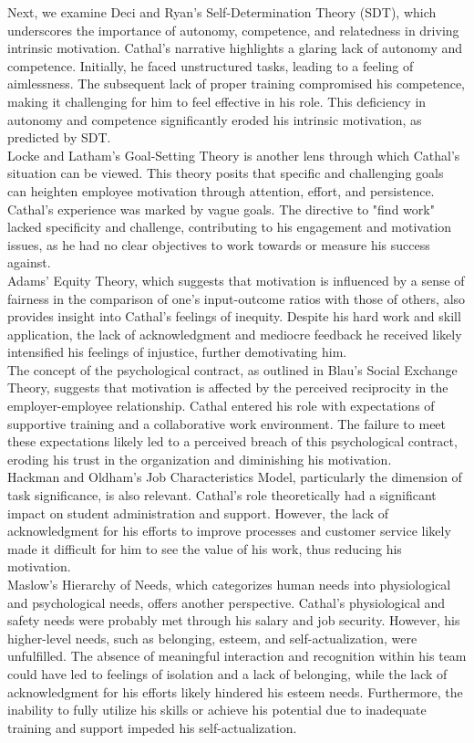 \documentclass[12pt]{article}
\begin{document}
\begin{flushleft}
Next, we examine Deci and Ryan's Self-Determination Theory (SDT), which underscores the importance of autonomy, competence, and relatedness in driving intrinsic motivation. Cathal's narrative highlights a glaring lack of autonomy and competence. Initially, he faced unstructured tasks, leading to a feeling of aimlessness. The subsequent lack of proper training compromised his competence, making it challenging for him to feel effective in his role. This deficiency in autonomy and competence significantly eroded his intrinsic motivation, as predicted by SDT.\\
Locke and Latham's Goal-Setting Theory is another lens through which Cathal's situation can be viewed. This theory posits that specific and challenging goals can heighten employee motivation through attention, effort, and persistence. Cathal's experience was marked by vague goals. The directive to "find work" lacked specificity and challenge, contributing to his engagement and motivation issues, as he had no clear objectives to work towards or measure his success against.\\
Adams' Equity Theory, which suggests that motivation is influenced by a sense of fairness in the comparison of one's input-outcome ratios with those of others, also provides insight into Cathal's feelings of inequity. Despite his hard work and skill application, the lack of acknowledgment and mediocre feedback he received likely intensified his feelings of injustice, further demotivating him.\\
The concept of the psychological contract, as outlined in Blau's Social Exchange Theory, suggests that motivation is affected by the perceived reciprocity in the employer-employee relationship. Cathal entered his role with expectations of supportive training and a collaborative work environment. The failure to meet these expectations likely led to a perceived breach of this psychological contract, eroding his trust in the organization and diminishing his motivation.\\
Hackman and Oldham's Job Characteristics Model, particularly the dimension of task significance, is also relevant. Cathal's role theoretically had a significant impact on student administration and support. However, the lack of acknowledgment for his efforts to improve processes and customer service likely made it difficult for him to see the value of his work, thus reducing his motivation.\\
Maslow's Hierarchy of Needs, which categorizes human needs into physiological and psychological needs, offers another perspective. Cathal's physiological and safety needs were probably met through his salary and job security. However, his higher-level needs, such as belonging, esteem, and self-actualization, were unfulfilled. The absence of meaningful interaction and recognition within his team could have led to feelings of isolation and a lack of belonging, while the lack of acknowledgment for his efforts likely hindered his esteem needs. Furthermore, the inability to fully utilize his skills or achieve his potential due to inadequate training and support impeded his self-actualization.\\

\end{flushleft}
\end{document}
